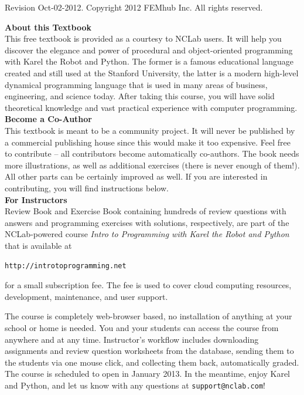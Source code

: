 \documentclass[article,A4,12pt]{llncs}
\newif\iffullversion
\begin{document}
\begin{center}
\iffullversion
\else
\centerline{\huge \color{red}{PREVIEW}}
\fi
\vfill
\end{center}
\vfill
\vfill
\begin{center}
Revision Oct-02-2012. Copyright 2012 FEMhub Inc. All rights reserved.
\end{center}
\newpage
\vbox{}
\vfill
{
\noindent
{\bf About this Textbook}\\[4mm]
This free textbook is provided as a courtesy to NCLab users. 
It will help you discover the elegance and power of procedural and 
object-oriented programming with Karel the Robot and Python. The former 
is a famous educational language created and still used at the Stanford University, 
the latter is a modern high-level dynamical programming language that is used
in many areas of business, engineering, and science today. After taking 
this course, you will have solid theoretical knowledge and vast
practical experience with computer programming. \\[4mm]

\noindent
{\bf Become a Co-Author}\\[4mm]
This textbook is meant to be a community project. It will never be published by a commercial
publishing house since this would make it too expensive. Feel free to contribute -- 
all contributors become automatically co-authors. The book needs more illustrations, 
as well as additional exercises (there is never enough of them!). All other parts 
can be certainly improved as well. If you are interested 
in contributing, you will find instructions below. \\[4mm]

\noindent
{\bf For Instructors}\\[4mm]
Review Book and Exercise Book containing 
hundreds of review questions with answers and programming exercises with
solutions, respectively, are part of the NCLab-powered course 
{\em Intro to Programming with Karel the Robot and Python} that is 
available at \\[4mm]

{\color{blue}
\centerline{\tt http://introtoprogramming.net}
}
\vspace{5mm}

\noindent
for a small subscription fee. The fee is used to cover cloud computing resources, 
development, maintenance, and user support. 

The course is completely web-browser based, no installation of anything at your school 
or home is needed. You and your students can access the course from anywhere and at any 
time. Instructor's workflow includes downloading assignments and review
question worksheets from the database, sending them to the students 
via one mouse click, and collecting them back, automatically graded. 
The course is scheduled to open in January 2013. In the meantime, enjoy 
Karel and Python, and let us know with any questions at {\tt support@nclab.com}!
}
\vspace{8mm}
\end{document}
